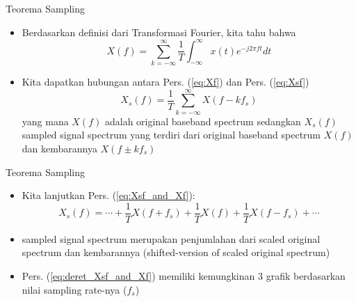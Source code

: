 \documentclass[pdflatex,compress,mathserif]{beamer}
\begin{document}
\begin{frame}{Teorema Sampling}
    \begin{itemize}
        \item Berdasarkan definisi dari Transformasi Fourier, kita tahu bahwa
        \begin{equation}
            X(f) = \sum_{k = -\infty}^{\infty} \frac{1}{T} \int_{-\infty}^{\infty} x(t) e^{-j2\pi ft} dt
            \label{eq:Xf}
        \end{equation}
        \item Kita dapatkan hubungan antara Pers. (\ref{eq:Xf}) dan Pers. (\ref{eq:Xsf})
        \begin{equation}
            X_s(f) = \frac{1}{T} \sum_{k = -\infty}^{\infty} X(f - kf_s)
            \label{eq:Xsf_and_Xf}
        \end{equation}
        yang mana $X(f)$ adalah original baseband spectrum sedangkan $X_s(f)$ sampled signal spectrum yang terdiri dari original baseband spectrum $X(f)$ dan kembarannya $X(f\pm kf_s)$
    \end{itemize}
\end{frame}

\begin{frame}{Teorema Sampling}
    \begin{itemize}
        \item Kita lanjutkan Pers. (\ref{eq:Xsf_and_Xf}):
        \begin{equation}
            X_s(f) = \cdots + \frac{1}{T}X(f+f_s) + \frac{1}{T}X(f) + \frac{1}{T}X(f-f_s) + \cdots
            \label{eq:deret_Xsf_and_Xf}
        \end{equation}
        \item sampled signal spectrum merupakan penjumlahan dari scaled original spectrum dan kembarannya (shifted-version of scaled original spectrum)
        \item Pers. (\ref{eq:deret_Xsf_and_Xf}) memiliki kemungkinan 3 grafik berdasarkan nilai sampling rate-nya ($f_s$)
    \end{itemize}
\end{frame}
\end{document}
